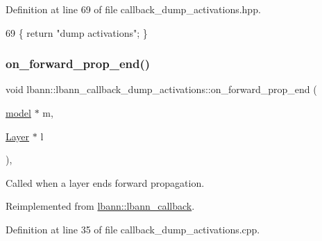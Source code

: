 Definition at line 69 of file callback\+\_\+dump\+\_\+activations.\+hpp.


\begin{DoxyCode}
69 \{ \textcolor{keywordflow}{return} \textcolor{stringliteral}{"dump activations"}; \}
\end{DoxyCode}
\mbox{\label{classlbann_1_1lbann__callback__dump__activations_acf4429a44ead6ffea303528618bc6572}} 
\subsubsection{\texorpdfstring{on\+\_\+forward\+\_\+prop\+\_\+end()}{on\_forward\_prop\_end()}}
{\footnotesize\ttfamily void lbann\+::lbann\+\_\+callback\+\_\+dump\+\_\+activations\+::on\+\_\+forward\+\_\+prop\+\_\+end (\begin{DoxyParamCaption}\item[{\hyperlink{classlbann_1_1model}{model} $\ast$}]{m,  }\item[{\hyperlink{classlbann_1_1Layer}{Layer} $\ast$}]{l }\end{DoxyParamCaption})\hspace{0.3cm}{\ttfamily [override]}, {\ttfamily [virtual]}}

Called when a layer ends forward propagation. 

Reimplemented from \hyperlink{classlbann_1_1lbann__callback_a5eff0a59fbce98a981d9cdd0547a3ad5}{lbann\+::lbann\+\_\+callback}.



Definition at line 35 of file callback\+\_\+dump\+\_\+activations.\+cpp.


